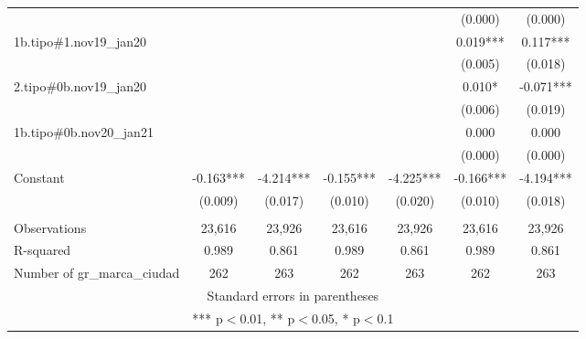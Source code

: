 \begin{tabular}{lcccccc}
 &  &  &  &  & (0.000) & (0.000) \\
1b.tipo\#1.nov19\_jan20 &  &  &  &  & 0.019*** & 0.117*** \\
 &  &  &  &  & (0.005) & (0.018) \\
2.tipo\#0b.nov19\_jan20 &  &  &  &  & 0.010* & -0.071*** \\
 &  &  &  &  & (0.006) & (0.019) \\
1b.tipo\#0b.nov20\_jan21 &  &  &  &  & 0.000 & 0.000 \\
 &  &  &  &  & (0.000) & (0.000) \\
Constant & -0.163*** & -4.214*** & -0.155*** & -4.225*** & -0.166*** & -4.194*** \\
 & (0.009) & (0.017) & (0.010) & (0.020) & (0.010) & (0.018) \\
 &  &  &  &  &  &  \\
Observations & 23,616 & 23,926 & 23,616 & 23,926 & 23,616 & 23,926 \\
R-squared & 0.989 & 0.861 & 0.989 & 0.861 & 0.989 & 0.861 \\
 Number of gr\_marca\_ciudad & 262 & 263 & 262 & 263 & 262 & 263 \\ \hline
\multicolumn{7}{c}{ Standard errors in parentheses} \\
\multicolumn{7}{c}{ *** p$<$0.01, ** p$<$0.05, * p$<$0.1} \\
\end{tabular}
